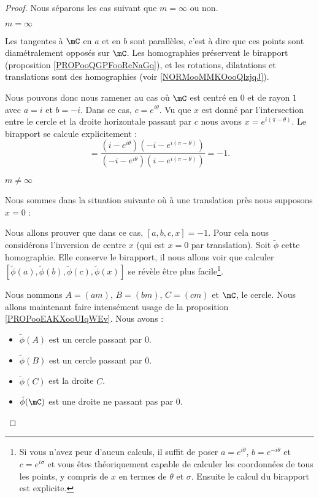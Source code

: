 \begin{proof}
    Nous séparons les cas suivant que \( m=\infty\) ou non.
    \begin{subproof}
        \item[\( m=\infty\)]

            Les tangentes à \( \mC\) en \( a\) et en \( b\) sont parallèles, c'est à dire que ces points sont diamétralement opposés sur \( \mC\). Les homographies préservent le birapport (proposition \ref{PROPooQGPFooReNaGq}), et les rotations, dilatations et translations sont des homographies (voir \ref{NORMooMMKOooQlzjqJ}).

            Nous pouvons donc nous ramener au cas où \( \mC\) est centré en \( 0\) et de rayon \( 1\) avec \( a=i\) et \( b=-i\). Dans ce cas, \( c= e^{i\theta}\). Vu que \( x\) est donné par l'intersection entre le cercle et la droite horizontale passant par \( c\) nous avons \( x= e^{i(\pi-\theta)}\). Le birapport se calcule explicitement :
            \begin{equation}
                [a,b,c,x]=\frac{ (i- e^{i\theta})(-i- e^{i(\pi-\theta)}) }{ (-i- e^{i\theta})(i- e^{i(\pi-\theta)}) }=-1.
            \end{equation}

        \item[\( m\neq\infty\)]

            Nous sommes dans la situation suivante où à une translation près nous supposons \( x=0\) :


            \begin{center}
                
            \end{center}

            Nous allons prouver que dans ce cas, \( [a,b,c,x]=-1\). Pour cela nous considérons l'inversion de centre \( x\) (qui est \( x=0\) par translation). Soit \( \tilde \phi\) cette homographie. Elle conserve le birapport, il nous allons voir que calculer \( [\tilde \phi(a),\tilde \phi(b),\tilde \phi(c),\tilde \phi(x)]\) se révèle être plus facile\footnote{Si vous n'avez peur d'aucun calculs, il suffit de poser \( a= e^{i\theta}\), \( b= e^{-i\theta}\) et \( c= e^{i\sigma}\) et vous êtes théoriquement capable de calculer les coordonnées de tous les points, y compris de \( x\) en termes de \( \theta\) et \( \sigma\). Ensuite le calcul du birapport est explicite.}.

            Nous nommons \( A=(am)\), \( B=(bm)\), \( C=(cm)\) et \( \mC\), le cercle. Nous allons maintenant faire intensément usage de la proposition \ref{PROPooEAKXooUIqWEv}. Nous avons :
            \begin{itemize}
                \item \( \tilde \phi(A)\) est un cercle passant par \( 0\).
                \item \( \tilde \phi(B)\) est un cercle passant par \( 0\).
                \item \( \tilde \phi(C)\) est la droite \( C\). 
                \item \( \tilde \phi(\mC)\) est une droite ne passant pas par \( 0\).
            \end{itemize}


\end{subproof}
\end{proof}
